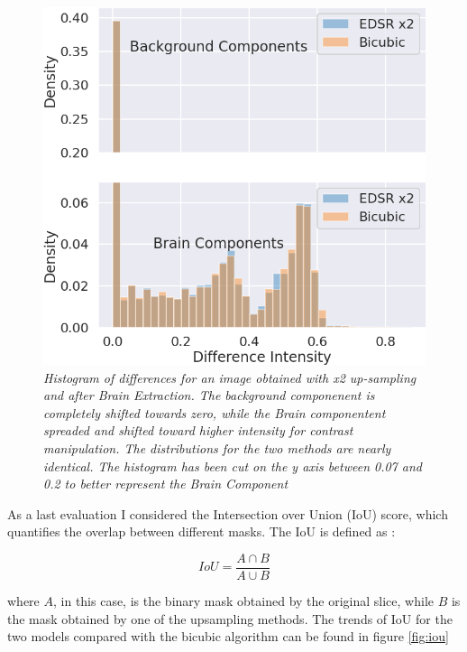 \documentclass[12pt,a4paper]{report}
\begin{document}
\begin{figure}[H]
 \centering
 \includegraphics[scale=0.4]{./images/histo_bet_edsr.png}
 \caption{\it Histogram of differences for an image obtained with x2 up-sampling and after Brain Extraction. The background componenent is completely shifted towards zero, while the Brain componentent spreaded and shifted toward higher intensity for contrast manipulation. The distributions for the two methods are nearly identical. The histogram has been cut on the y axis between 0.07 and 0.2 to better represent the Brain Component}
 \label{fig:histo-bet-edsr}
\end{figure}

As a last evaluation I considered the Intersection over Union (IoU) score, which quantifies the overlap between different masks. 
The IoU is defined as : 

\begin{equation}
 IoU = \frac{A \cap B}{A \cup B}
\end{equation}

where $A$, in this case, is the binary mask obtained by the original slice, while $B$ is the mask obtained by one of the upsampling methods.
The trends of IoU for the two models compared with the bicubic algorithm can be found in figure \ref{fig:iou}
\end{document}
